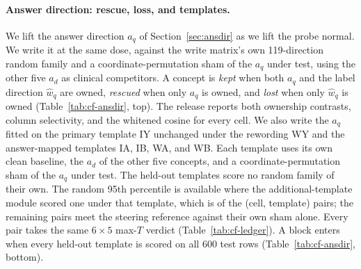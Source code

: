 \documentclass{article}
\begin{document}
\paragraph{Answer direction: rescue, loss, and templates.} We lift the answer direction $a_q$ of Section~\ref{sec:ansdir} as we lift the probe normal. We write it at the same dose, against the write matrix's own 119-direction random family and a coordinate-permutation sham of the $a_q$ under test, using the other five $a_d$ as clinical competitors. A concept is \emph{kept} when both $a_q$ and the label direction $\hat w_q$ are owned, \emph{rescued} when only $a_q$ is owned, and \emph{lost} when only $\hat w_q$ is owned (Table~\ref{tab:cf-ansdir}, top). The release reports both ownership contrasts, column selectivity, and the whitened cosine for every cell. We also write the $a_q$ fitted on the primary template IY unchanged under the rewording WY and the answer-mapped templates IA, IB, WA, and WB. Each template uses its own clean baseline, the $a_d$ of the other five concepts, and a coordinate-permutation sham of the $a_q$ under test. The held-out templates score no random family of their own. The random 95th percentile is available where the additional-template module scored one under that template, which is \cfAnsdirtRefPairs{} of the \cfAnsdirtLedgerPairs{} (cell, template) pairs; the remaining \cfAnsdirtShamPairs{} pairs meet the steering reference against their own sham alone. Every pair takes the same $6\times5$ max-$T$ verdict (Table~\ref{tab:cf-ledger}). A block enters when every held-out template is scored on all 600 test rows (Table~\ref{tab:cf-ansdir}, bottom).
\end{document}
